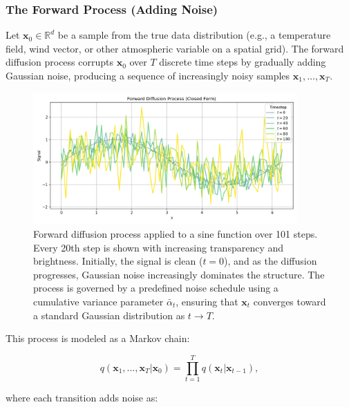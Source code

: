 %
\subsubsection{The Forward Process (Adding Noise)}

Let $\mathbf{x}_0 \in \mathbb{R}^d$ be a sample from the true data distribution (e.g., a temperature field, wind vector, or other atmospheric variable on a spatial grid). The forward diffusion process corrupts $\mathbf{x}_0$ over $T$ discrete time steps by gradually adding Gaussian noise, producing a sequence of increasingly noisy samples $\mathbf{x}_1, \dots, \mathbf{x}_T$.

\begin{figure}[htbp]
    \centering
    \includegraphics[width=0.9\textwidth]{images/diffusion1.png}
    \caption{
        Forward diffusion process applied to a sine function over 101 steps.
        Every 20th step is shown with increasing transparency and brightness.
        Initially, the signal is clean (\( t=0 \)), and as the diffusion progresses,
        Gaussian noise increasingly dominates the structure. The process is
        governed by a predefined noise schedule using a cumulative variance
        parameter \( \bar{\alpha}_t \), ensuring that \( \mathbf{x}_t \) converges
        toward a standard Gaussian distribution as \( t \rightarrow T \).
    }
    \label{fig:diffusion-forward}
\end{figure}


This process is modeled as a Markov chain:

$$
q(\mathbf{x}_1, \dots, \mathbf{x}_T | \mathbf{x}_0) = \prod_{t=1}^T q(\mathbf{x}_t | \mathbf{x}_{t-1}),
$$

where each transition adds noise as:

